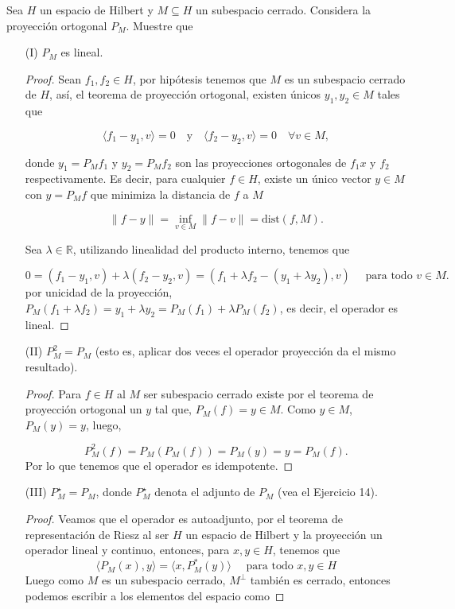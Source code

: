  Sea $H$ un espacio de Hilbert y $  M \subseteq H$ un subespacio cerrado. Considera la proyección ortogonal $P_M$. Muestre que
 \begin{itemize}
     \item[(I)] $P_M$ es lineal.

     \begin{proof}


Sean \(f_1, f_2 \in H \), por hipótesis tenemos que \( M \) es un subespacio cerrado de \( H \), así, el teorema de proyección ortogonal, existen únicos \( y_1, y_2 \in M \) tales que

\[
\langle f_1 - y_1, v \rangle = 0 \quad \text{y} \quad \langle f_2 - y_2, v \rangle = 0 \quad \forall v \in M,
\]

donde \( y_1 = P_M f_1 \) y \( y_2 = P_M f_2 \) son las proyecciones ortogonales de \( f_1x \) y \( f_2 \) respectivamente. Es decir, para cualquier \( f \in H \), existe un único vector \( y \in M \) con \( y = P_M f \) que minimiza la distancia de \( f \) a \( M \)

\[
\|f - y\| = \inf_{v \in M} \|f - v\| = \text{dist}(f, M).
\]


Sea $\lambda \in \mathbb{R}$, utilizando linealidad del producto interno, tenemos que

\[
0 = (f_1 - y_1, v) + \lambda(f_2 - y_2, v) = (f_1 + \lambda f_2 - (y_1 + \lambda y_2), v) \quad \text{ para todo } v \in M.
\]
por unicidad de la proyección, \( P_M(f_1 + \lambda f_2) = y_1 + \lambda y_2 = P_M(f_1) + \lambda P_M(f_2) \), es decir, el operador es lineal.

\end{proof}

\item[(II)] $P_M^2=P_M$ (esto es, aplicar dos veces el operador proyección da el mismo resultado).

\begin{proof}
Para \( f \in H \) al $M$ ser subespacio cerrado existe por el teorema de proyección ortogonal un $y$ tal que, \( P_M(f) = y \in M \). Como \( y \in M \), \( P_M(y) = y \), luego,

\[
P_M^2(f) = P_M(P_M(f)) = P_M(y) = y = P_M(f).
\]
Por lo que tenemos que el operador es idempotente.
\end{proof}
\item[(III)] $P_M^{\star}=P_M$, donde $P_M^{\star}$ denota el adjunto de $P_M$ (vea el Ejercicio 14).
\begin{proof}
Veamos que el operador es autoadjunto, por el teorema de representación de Riesz al ser $H$ un espacio de Hilbert y la proyección un operador lineal y continuo, entonces, para \( x, y \in H \), tenemos que 
\[
\langle P_M(x), y \rangle = \langle x, P_M^*(y) \rangle \quad \text{ para todo } x, y \in H
\]
Luego como $M$ es un subespacio cerrado, $M^{\perp}$ también es cerrado,  entonces podemos escribir a los elementos del espacio como


\end{proof}
\end{itemize}
